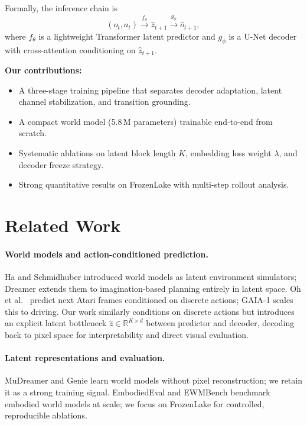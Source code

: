 \documentclass[11pt]{article}
\begin{document}
Formally, the inference chain is
\begin{equation}
(o_t, a_t) \xrightarrow{f_\theta} \hat{z}_{t+1} \xrightarrow{g_\phi} \hat{o}_{t+1},
\end{equation}
where $f_\theta$ is a lightweight Transformer latent predictor and $g_\phi$ is a
U-Net decoder with cross-attention conditioning on $\hat{z}_{t+1}$.

\textbf{Our contributions:}
\begin{itemize}
  \item A three-stage training pipeline that separates decoder adaptation,
        latent channel stabilization, and transition grounding.
  \item A compact world model (5.8\,M parameters) trainable end-to-end from scratch.
  \item Systematic ablations on latent block length $K$, embedding loss weight $\lambda$,
        and decoder freeze strategy.
  \item Strong quantitative results on FrozenLake with multi-step rollout analysis.
\end{itemize}

\section{Related Work}

\paragraph{World models and action-conditioned prediction.}
Ha and Schmidhuber \cite{ha2018world} introduced world models as latent environment
simulators; Dreamer \cite{hafner2019dream,hafner2020mastering} extends them to
imagination-based planning entirely in latent space.
Oh et al.~\cite{oh2015action} predict next Atari frames conditioned on discrete actions;
GAIA-1 \cite{hu2023gaia} scales this to driving.
Our work similarly conditions on discrete actions but introduces an explicit
latent bottleneck $\hat{z}\!\in\!\mathbb{R}^{K\times d}$ between predictor and decoder,
decoding back to pixel space for interpretability and direct visual evaluation.

\paragraph{Latent representations and evaluation.}
MuDreamer \cite{burchimudreamer} and Genie \cite{bruce2024genie} learn world models
without pixel reconstruction; we retain it as a strong training signal.
EmbodiedEval \cite{cheng2025embodiedeval} and EWMBench \cite{hu2025ewmbench}
benchmark embodied world models at scale; we focus on FrozenLake for controlled,
reproducible ablations.
\end{document}
